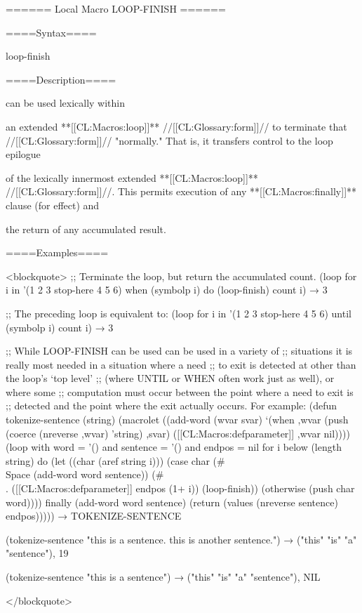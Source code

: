====== Local Macro LOOP-FINISH ======

====Syntax====

\DefmacNoReturn loop-finish {\noargs}

====Description====

 can be used lexically within

an extended **[[CL:Macros:loop]]** //[[CL:Glossary:form]]// to terminate that //[[CL:Glossary:form]]// "normally." That is, it transfers control to the loop epilogue

of the lexically innermost extended **[[CL:Macros:loop]]** //[[CL:Glossary:form]]//. This permits execution of any **[[CL:Macros:finally]]** clause (for effect) and

the return of any accumulated result.

====Examples====

<blockquote> ;; Terminate the loop, but return the accumulated count. (loop for i in '(1 2 3 stop-here 4 5 6) when (symbolp i) do (loop-finish) count i) → 3

;; The preceding loop is equivalent to: (loop for i in '(1 2 3 stop-here 4 5 6) until (symbolp i) count i) → 3

;; While LOOP-FINISH can be used can be used in a variety of ;; situations it is really most needed in a situation where a need ;; to exit is detected at other than the loop's `top level' ;; (where UNTIL or WHEN often work just as well), or where some ;; computation must occur between the point where a need to exit is ;; detected and the point where the exit actually occurs. For example: (defun tokenize-sentence (string) (macrolet ((add-word (wvar svar) `(when ,wvar (push (coerce (nreverse ,wvar) 'string) ,svar) ([[CL:Macros:defparameter]] ,wvar nil)))) (loop with word = '() and sentence = '() and endpos = nil for i below (length string) do (let ((char (aref string i))) (case char (#\\Space (add-word word sentence)) (#\\. ([[CL:Macros:defparameter]] endpos (1+ i)) (loop-finish)) (otherwise (push char word)))) finally (add-word word sentence) (return (values (nreverse sentence) endpos))))) → TOKENIZE-SENTENCE

(tokenize-sentence "this is a sentence. this is another sentence.") → ("this" "is" "a" "sentence"), 19

(tokenize-sentence "this is a sentence") → ("this" "is" "a" "sentence"), NIL

</blockquote>

